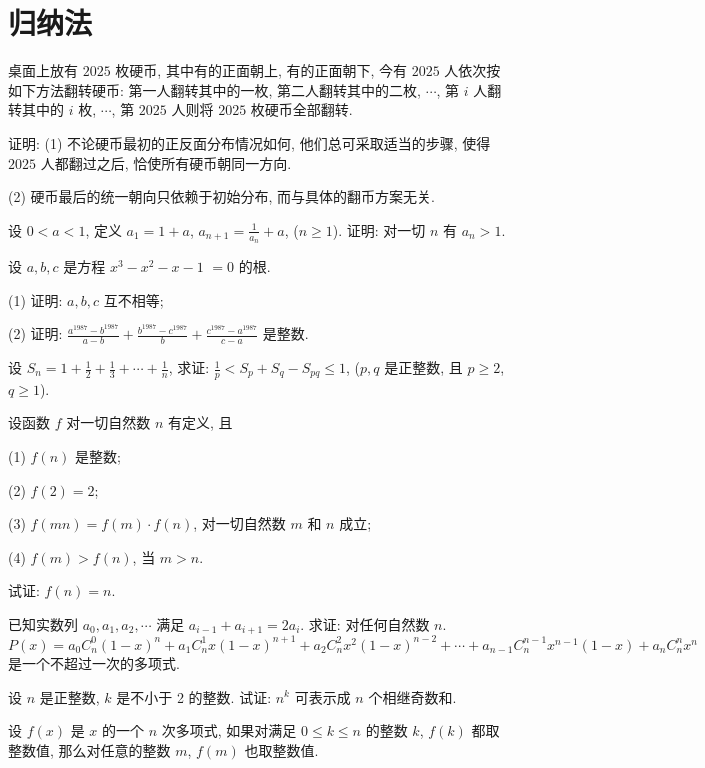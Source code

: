 \section{归纳法}
桌面上放有 $2025$ 枚硬币, 其中有的正面朝上, 有的正面朝下, 今有 $2025$ 人依次按如下方法翻转硬币: 
第一人翻转其中的一枚, 第二人翻转其中的二枚, $\cdots$, 第 $i$ 人翻转其中的 $i$ 枚, 
$\cdots$, 第 $2025$ 人则将 $2025$ 枚硬币全部翻转.

证明: (1) 不论硬币最初的正反面分布情况如何, 他们总可采取适当的步骤, 使得 $2025$ 人都翻过之后, 恰使所有硬币朝同一方向.

(2) 硬币最后的统一朝向只依赖于初始分布, 而与具体的翻币方案无关.
\eq

设 $0<a<1$, 定义 $a_{1}=1+a$, $a_{n+1}=\frac{1}{a_{n}}+a$, ($n\ge1$). 证明: 对一切 $n$ 有 $a_{n}>1$.
\eq

设 $a,b,c$ 是方程 $x^{3}-x^{2}-x-1$ $=0$ 的根.

(1) 证明: $a,b,c$ 互不相等;

(2) 证明: $\frac{a^{1987}-b^{1987}}{a-b}+\frac{b^{1987}-c^{1987}}{b}+\frac{c^{1987}-a^{1987}}{c-a}$
是整数.
\eq

设 $S_{n}=1+\frac{1}{2}+\frac{1}{3}+\cdots+\frac{1}{n}$, 求证: $\frac{1}{p}<S_{p}+S_{q}-S_{pq}\le1$,
($p,q$ 是正整数, 且 $p\ge2$, $q\ge 1$).
\eq

设函数 $f$ 对一切自然数 $n$ 有定义, 且

(1) $f(n)$ 是整数;

(2) $f(2)=2$;

(3) $f(mn)=f(m)\cdot f(n)$, 对一切自然数 $m$ 和 $n$ 成立; 

(4) $f(m)>f(n)$, 当 $m>n$.

试证: $f(n)=n$.
\eq

已知实数列 $a_{0},a_{1},a_{2},\cdots$ 满足 $a_{i-1}+a_{i+1}=2a_{i}$. 求证:
对任何自然数 $n$.
\[
P(x)=a_{0}C_{n}^{0}(1-x)^{n}+a_{1}C_{n}^{1}x(1-x)^{n+1}+a_{2}C_{n}^{2}x^{2}(1-x)^{n-2}+\cdots+a_{n-1}C_{n}^{n-1}x^{n-1}(1-x)+a_{n}C_{n}^{n}x^{n}
\]
是一个不超过一次的多项式.
\eq

设 $n$ 是正整数, $k$ 是不小于 2 的整数. 试证: $n^{k}$ 可表示成 $n$ 个相继奇数和.
\eq

设 $f(x)$ 是 $x$ 的一个 $n$ 次多项式, 如果对满足 $0\le k\le n$ 的整数 $k$, $f(k)$
都取整数值, 那么对任意的整数 $m$, $f(m)$ 也取整数值.
\eq

